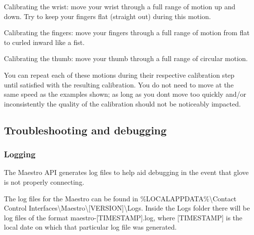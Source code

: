 \begin{DoxyEnumerate}
\item Calibrating the wrist\+: move your wrist through a full range of motion up and down. Try to keep your fingers flat (straight out) during this motion. 
\item Calibrating the fingers\+: move your fingers through a full range of motion from flat to curled inward like a fist. 
\item Calibrating the thumb\+: move your thumb through a full range of circular motion. 
\end{DoxyEnumerate}

You can repeat each of these motions during their respective calibration step until satisfied with the resulting calibration. You do not need to move at the same speed as the examples shown; as long as you don\textquotesingle{}t move too quickly and/or inconsistently the quality of the calibration should not be noticeably impacted.

\subsection*{Troubleshooting and debugging}

\subsubsection*{Logging}

The Maestro A\+PI generates log files to help aid debugging in the event that glove is not properly connecting.

The log files for the Maestro can be found in {\ttfamily \%L\+O\+C\+A\+L\+A\+P\+P\+D\+A\+TA\%\textbackslash{}Contact Control Interfaces\textbackslash{}Maestro\textbackslash{}\mbox{[}V\+E\+R\+S\+I\+ON\mbox{]}\textbackslash{}Logs}. Inside the {\ttfamily Logs} folder there will be log files of the format {\ttfamily maestro-\/\mbox{[}T\+I\+M\+E\+S\+T\+A\+MP\mbox{]}.log}, where {\ttfamily \mbox{[}T\+I\+M\+E\+S\+T\+A\+MP\mbox{]}} is the local date on which that particular log file was generated.

